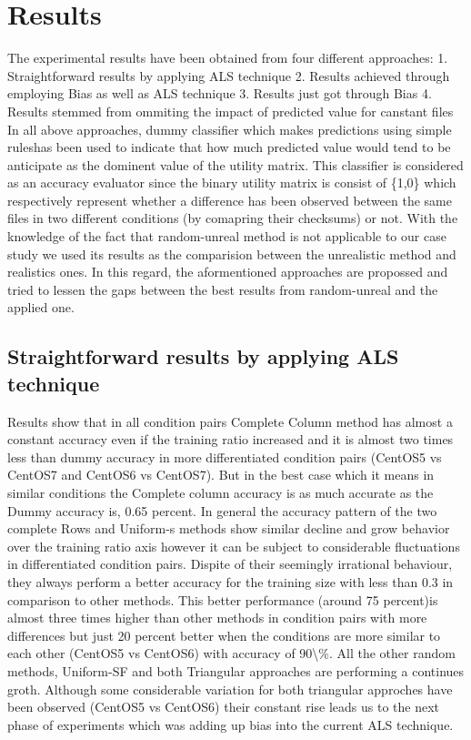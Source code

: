 \documentclass[10pt, conference, compsocconf]{IEEEtran}
\begin{document}
\section{Results}
The experimental results have been obtained from four different approaches:
1. Straightforward results by applying ALS technique
2. Results achieved through employing Bias as well as ALS technique
3. Results just got through Bias 
4. Results stemmed from ommiting the impact of predicted value for canstant files 
In all above approaches, dummy classifier which makes predictions using simple rules\cite{URL}has been used to indicate that how much predicted value would tend to be anticipate as the dominent value of the utility matrix. This classifier is considered as an accuracy evaluator since the binary utility matrix is consist of \{1,0\} which respectively represent whether a difference has been observed between the same files in two different conditions (by comapring their checksums) or not.
With the knowledge of the fact that random-unreal method is not applicable to our case study we used its results as the comparision between the unrealistic method and realistics ones. In this regard, the aformentioned approaches are propossed and tried to lessen the gaps between the best results from random-unreal and the applied one.
\subsection{Straightforward results by applying ALS technique}
Results show that in all condition pairs Complete Column method has almost a constant accuracy even if the training ratio increased and it is almost two times less than dummy accuracy in more differentiated condition pairs (CentOS5 vs CentOS7 and CentOS6 vs CentOS7). But in the best case which it means in similar conditions the Complete column accuracy is as much accurate as the Dummy accuracy is, \num{0.65} percent.
In general the accuracy pattern of the two complete Rows and Uniform-s methods show similar decline and grow behavior over the training ratio axis however it can be subject to considerable fluctuations in differentiated condition pairs. Dispite of their seemingly irrational behaviour, they always perform a better accuracy for the training size with less than \num{0.3} in comparison to other methods. This better performance (around 75 percent)is almost three times higher than other methods in condition pairs with more differences but just 20 percent better when the conditions are more similar to each other (CentOS5 vs CentOS6) with accuracy of \num{90\%}.
All the other random methods, Uniform-SF and both Triangular approaches are performing a continues groth. Although some considerable variation for both triangular approches have been observed (CentOS5 vs CentOS6) their constant rise leads us to the next phase of experiments which was adding up bias into the current ALS technique. 
\end{document}
